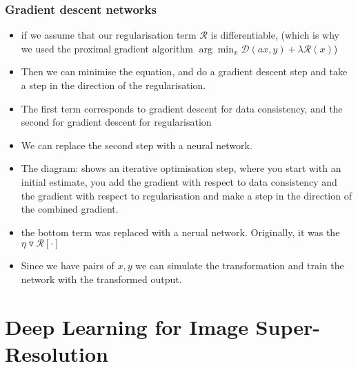 \documentclass[11pt]{article}
\begin{document}
\subsubsection{Gradient descent networks}

\begin{minipage}[l]{.5\linewidth}
    \begin{figure}[H]
        \centering
    \end{figure}    
\end{minipage}\hfill
\begin{minipage}[r]{.48\linewidth}
    \begin{itemize}
        \item if we assume that our regularisation term $\mathcal R$ is differentiable, (which is why we used the proximal gradient algorithm $\arg \min_x \mathcal D(ax,y)+\lambda\mathcal R (x)$)
        \item Then we can minimise the equation, and do a gradient descent step and take a step in the direction of the regularisation.
        \item The first term corresponds to gradient descent for data consistency, and the second for gradient descent for regularisation
    \end{itemize}
\end{minipage}

\begin{itemize}
    \item We can replace the second step with a neural network.
    \item The diagram: shows an iterative optimisation step, where you start with an initial estimate, you add the gradient with respect to data consistency and the gradient with respect to regularisation and make a step in the direction of the combined gradient.
    \item the bottom term was replaced with a nerual network. Originally, it was the $\eta \triangledown \mathcal R [\cdot]$
    \item Since we have pairs of $x,y$ we can simulate the transformation and train the network with the transformed output.
\end{itemize}

\section{Deep Learning for Image Super-Resolution}
\end{document}
